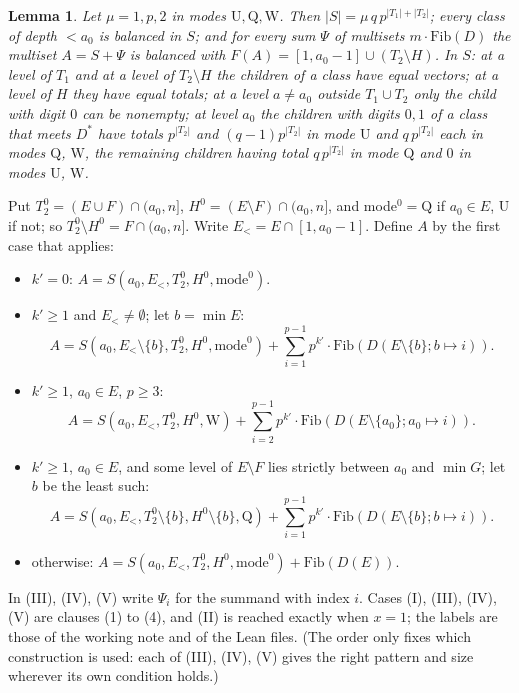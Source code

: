 \documentclass[11pt,a4paper]{amsart}
\newtheorem{lemma}[theorem]{Lemma}
\theoremstyle{definition}
\theoremstyle{remark}
\begin{document}
\begin{lemma}\label{lem:shape}
Let $\mu=1,p,2$ in modes $\mathrm U,\mathrm Q,\mathrm W$. Then $|S|=\mu\,q\,p^{|T_1|+|T_2|}$; every class of
depth $<a_0$ is balanced in $S$; and for every sum $\Psi$ of multisets $m\cdot\mathrm{Fib}(D)$ the multiset
$A=S+\Psi$ is balanced with $F(A)=[1,a_0-1]\cup(T_2\setminus H)$. In $S$: at a level of $T_1$ and at a level
of $T_2\setminus H$ the children of a class have equal vectors; at a level of $H$ they have equal totals;
at a level $a\ne a_0$ outside $T_1\cup T_2$ only the child with digit $0$ can be nonempty; at level $a_0$ the
children with digits $0,1$ of a class that meets $D^*$ have totals $p^{|T_2|}$ and $(q-1)p^{|T_2|}$ in mode
$\mathrm U$ and $q\,p^{|T_2|}$ each in modes $\mathrm Q$, $\mathrm W$, the remaining children having total
$q\,p^{|T_2|}$ in mode $\mathrm Q$ and $0$ in modes $\mathrm U$, $\mathrm W$.
\end{lemma}

Put $T_2^0=(E\cup F)\cap(a_0,n]$, $H^0=(E\setminus F)\cap(a_0,n]$, and mode$^0=\mathrm Q$ if $a_0\in E$,
$\mathrm U$ if not; so $T_2^0\setminus H^0=F\cap(a_0,n]$. Write $E_<=E\cap[1,a_0-1]$. Define $A$ by the first
case that applies:
\begin{itemize}
\item[(I)] $k'=0$: $A=S(a_0,E_<,T_2^0,H^0,\text{mode}^0)$.
\item[(III)] $k'\ge1$ and $E_<\ne\emptyset$; let $b=\min E$:
 \[A=S(a_0,E_<\setminus\{b\},T_2^0,H^0,\text{mode}^0)+\sum_{i=1}^{p-1}p^{k'}\cdot\mathrm{Fib}(D(E\setminus\{b\};b\mapsto i)).\]
\item[(IV)] $k'\ge1$, $a_0\in E$, $p\ge3$:
 \[A=S(a_0,E_<,T_2^0,H^0,\mathrm W)+\sum_{i=2}^{p-1}p^{k'}\cdot\mathrm{Fib}(D(E\setminus\{a_0\};a_0\mapsto i)).\]
\item[(V)] $k'\ge1$, $a_0\in E$, and some level of $E\setminus F$ lies strictly between $a_0$ and $\min G$;
 let $b$ be the least such:
 \[A=S(a_0,E_<,T_2^0\setminus\{b\},H^0\setminus\{b\},\mathrm Q)+\sum_{i=1}^{p-1}p^{k'}\cdot\mathrm{Fib}(D(E\setminus\{b\};b\mapsto i)).\]
\item[(II)] otherwise: $A=S(a_0,E_<,T_2^0,H^0,\text{mode}^0)+\mathrm{Fib}(D(E))$.
\end{itemize}
In (III), (IV), (V) write $\Psi_i$ for the summand with index $i$. Cases (I), (III), (IV), (V) are clauses (1) to (4), and (II) is reached exactly when $x=1$; the labels are those of the working note and of the Lean files. (The order only fixes which construction is used: each of (III), (IV), (V) gives the right pattern and size wherever its own condition holds.)
\end{document}
